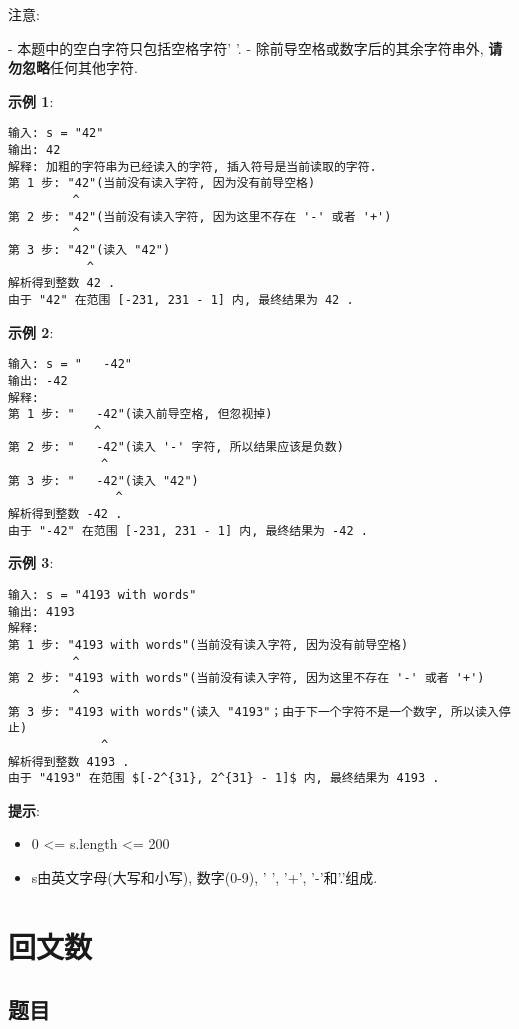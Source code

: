 \documentclass[oneside]{ctexbook}
\begin{document}
注意: 

- 本题中的空白字符只包括空格字符' '. 
- 除前导空格或数字后的其余字符串外, \textbf{请勿忽略}任何其他字符. 

\textbf{示例 1}: 

\begin{verbatim}
输入: s = "42"
输出: 42
解释: 加粗的字符串为已经读入的字符, 插入符号是当前读取的字符. 
第 1 步: "42"(当前没有读入字符, 因为没有前导空格)
         ^
第 2 步: "42"(当前没有读入字符, 因为这里不存在 '-' 或者 '+')
         ^
第 3 步: "42"(读入 "42")
           ^
解析得到整数 42 . 
由于 "42" 在范围 [-231, 231 - 1] 内, 最终结果为 42 . 
\end{verbatim}

\textbf{示例 2}: 

\begin{verbatim}
输入: s = "   -42"
输出: -42
解释: 
第 1 步: "   -42"(读入前导空格, 但忽视掉)
            ^
第 2 步: "   -42"(读入 '-' 字符, 所以结果应该是负数)
             ^
第 3 步: "   -42"(读入 "42")
               ^
解析得到整数 -42 . 
由于 "-42" 在范围 [-231, 231 - 1] 内, 最终结果为 -42 . 
\end{verbatim}

\textbf{示例 3}: 

\begin{verbatim}
输入: s = "4193 with words"
输出: 4193
解释: 
第 1 步: "4193 with words"(当前没有读入字符, 因为没有前导空格)
         ^
第 2 步: "4193 with words"(当前没有读入字符, 因为这里不存在 '-' 或者 '+')
         ^
第 3 步: "4193 with words"(读入 "4193"；由于下一个字符不是一个数字, 所以读入停止)
             ^
解析得到整数 4193 . 
由于 "4193" 在范围 $[-2^{31}, 2^{31} - 1]$ 内, 最终结果为 4193 . 
\end{verbatim}

\textbf{提示}:

\begin{itemize}
    \item 0 <= s.length <= 200
    \item s由英文字母(大写和小写), 数字(0-9), ' ', '+', '-'和'.'组成.
\end{itemize}

\chapter{回文数}

\section{题目}
\end{document}
